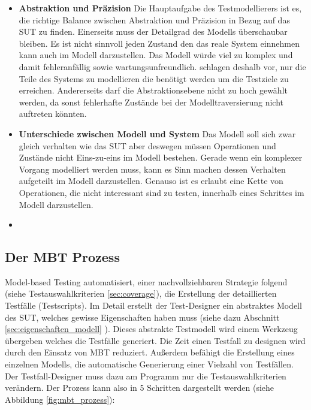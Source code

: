 \begin{itemize}
\item \textbf{Abstraktion und Präzision} Die Hauptaufgabe des Testmodellierers ist es, die richtige Balance zwischen Abstraktion und Präzision in Bezug auf das \ac{SUT} zu finden\cite{utting_practical_2007}. Einerseits muss der Detailgrad des Modells überschaubar bleiben. Es ist nicht sinnvoll jeden Zustand den das reale System einnehmen kann auch im Modell darzustellen. Das Modell würde viel zu komplex und damit fehleranfällig sowie wartungsunfreundlich. \citeauthor{utting_practical_2007} schlagen deshalb vor, nur die Teile des Systems zu modellieren die benötigt werden um die Testziele zu erreichen\cite{utting_practical_2007}. Andererseits darf die Abstraktionsebene nicht zu hoch gewählt werden, da sonst fehlerhafte Zustände bei der Modelltraversierung nicht auftreten könnten. 
\item \textbf{Unterschiede zwischen Modell und System} Das Modell soll sich zwar gleich verhalten wie das \ac{SUT} aber deswegen müssen Operationen und Zustände nicht Eins-zu-eins im Modell bestehen. Gerade wenn ein komplexer Vorgang modelliert werden muss, kann es Sinn machen dessen Verhalten aufgeteilt im Modell darzustellen. Genauso ist es erlaubt eine Kette von Operationen, die nicht interessant sind zu testen, innerhalb eines Schrittes im Modell darzustellen.
\item 
\end{itemize}

\subsection{Der MBT Prozess}
Model-based Testing automatisiert, einer nachvollziehbaren Strategie folgend (siehe Testauswahlkriterien \ref{sec:coverage}), die Erstellung der detaillierten Testfälle (Testscripts).
Im Detail erstellt der Test-Designer ein abstraktes Modell des SUT, welches gewisse Eigenschaften haben muss (siehe dazu Abschnitt \ref{sec:eigenschaften_modell} ). Dieses abstrakte Testmodell wird einem Werkzeug übergeben welches die Testfälle generiert. Die Zeit einen Testfall zu designen wird durch den Einsatz von MBT reduziert. Außerdem befähigt die Erstellung eines einzelnen Modells, die automatische Generierung einer Vielzahl von Testfällen. Der Testfall-Designer muss dazu am Programm nur die Testauswahlkriterien verändern. \cite{utting_practical_2007} Der Prozess kann also in 5 Schritten dargestellt werden (siehe Abbildung \ref{fig:mbt_prozess}):

